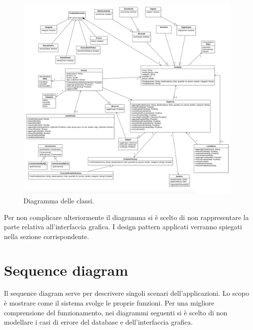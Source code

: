 \begin{figure}[H]
    \includegraphics[width=\linewidth]{images/class.jpeg}
    \caption{Diagramma delle classi.}
    \label{fig:classdiagram}
\end{figure}

Per non complicare ulteriormente il diagramma si è scelto di non rappresentare la parte relativa all'interfaccia grafica. I design pattern applicati verranno spiegati nella sezione corrispondente.

\newpage

\section{Sequence diagram}

Il sequence diagram serve per descrivere singoli scenari dell'applicazioni. Lo scopo è mostrare come il sistema svolge le proprie funzioni. Per una migliore comprensione del funzionamento, nei diagrammi seguenti si è scelto di non modellare i casi di errore del database e dell'interfaccia grafica. 

